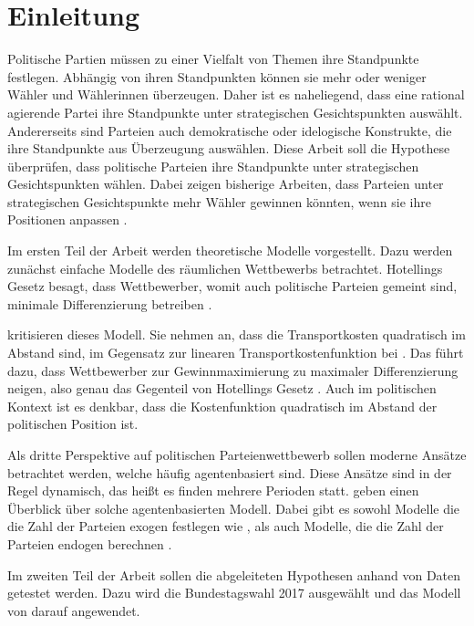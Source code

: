 
\chapter{Einleitung}\label{Kap-Einleitung}
Politische Partien müssen zu einer Vielfalt von Themen ihre Standpunkte festlegen.
Abhängig von ihren Standpunkten können sie mehr oder weniger Wähler und Wählerinnen überzeugen.
Daher ist es naheliegend, dass eine rational agierende Partei ihre Standpunkte unter strategischen Gesichtspunkten auswählt.
Andererseits sind Parteien auch demokratische oder idelogische Konstrukte, die ihre Standpunkte aus Überzeugung auswählen.
Diese Arbeit soll die Hypothese überprüfen, dass politische Parteien ihre Standpunkte unter strategischen Gesichtspunkten wählen.
Dabei zeigen bisherige Arbeiten, dass Parteien unter strategischen Gesichtspunkte mehr Wähler gewinnen könnten, wenn sie ihre Positionen anpassen \citep[S.\,257]{schofield1998germany}.

Im ersten Teil der Arbeit werden theoretische Modelle vorgestellt.
Dazu werden  zunächst einfache Modelle des räumlichen Wettbewerbs betrachtet.
Hotellings Gesetz besagt, dass Wettbewerber, womit auch politische Parteien gemeint sind, minimale Differenzierung betreiben \citep[S.\,54-5]{hotelling1929}.

\citet{aspremont1979} kritisieren dieses Modell.
Sie nehmen an, dass die Transportkosten quadratisch im Abstand sind, im Gegensatz zur linearen Transportkostenfunktion bei \citet{hotelling1929}.
Das führt dazu, dass Wettbewerber zur Gewinnmaximierung zu maximaler Differenzierung neigen, also genau das Gegenteil von Hotellings Gesetz \citep[S.\,1149]{aspremont1979}.
Auch im politischen Kontext ist es denkbar, dass die Kostenfunktion quadratisch im Abstand der politischen Position ist.

Als dritte Perspektive auf politischen Parteienwettbewerb sollen moderne Ansätze betrachtet werden, welche häufig agentenbasiert sind.
Diese Ansätze sind in der Regel dynamisch, das heißt es finden mehrere Perioden statt.
\citet{marchi2014ABMs} geben einen Überblick über solche agentenbasierten Modell.
Dabei gibt es sowohl Modelle die die Zahl der Parteien exogen festlegen wie \citet{laver2005policy}, als auch Modelle, die die Zahl der Parteien endogen berechnen \citep{laver2007endogenousParties}.

Im zweiten Teil der Arbeit sollen die abgeleiteten Hypothesen anhand von Daten getestet werden.
Dazu wird die Bundestagswahl 2017 ausgewählt und das Modell von \citet{laver2005policy} darauf angewendet.

